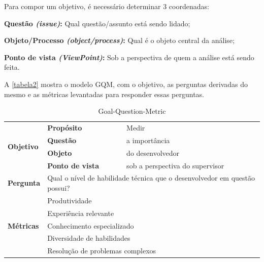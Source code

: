 Para compor um objetivo, é necessário determinar 3 coordenadas:

\begin{alineas}
	\item \textbf{Questão \textit{(issue)}:} Qual questão/assunto está sendo lidado;
	\item \textbf{Objeto/Processo \textit{(object/process)}:} Qual é o objeto central da análise;
	\item \textbf{Ponto de vista \textit{(ViewPoint)}:} Sob a perspectiva de quem a análise está sendo feita.
\end{alineas}
	
A \autoref{tabela2} mostra o modelo GQM, com o objetivo, as perguntas derivadas do mesmo e as métricas levantadas para responder essas perguntas.


\begin{table}[h]
	\footnotesize
	\caption{Goal-Question-Metric}
	\label{tabela2}
	\def\arraystretch{1.5}
	\begin{tabular}{|p{2cm}|p{6.25cm}|p{6.25cm}|}
		\hline
		\multirow{4}{*}{\textbf{Objetivo}} & \textbf{Propósito}                              & Medir                                                 \\ \cline{2-3} 
		& \textbf{Questão}                                & a importância                                         \\ \cline{2-3} 
		& \textbf{Objeto}                                 & do desenvolvedor                                      \\ \cline{2-3} 
		& \textbf{Ponto de vista}                         & sob a perspectiva do supervisor                       \\ \hline
		
		
		\textbf{Pergunta}                  & \multicolumn{2}{l|}{\parbox{12cm}{ Qual o nível de habilidade técnica que o desenvolvedor em questão possui?}}          \\ \hline
		\multirow{5}{*}{\textbf{Métricas}} 
		& \multicolumn{2}{l|}{Produtividade}                                                              \\ \cline{2-3} 
		& \multicolumn{2}{l|}{Experiência relevante}                                                              \\ \cline{2-3} 
		& \multicolumn{2}{l|}{Conhecimento especializado}                                                         \\ \cline{2-3} 
		& \multicolumn{2}{l|}{Diversidade de habilidades}                                                         \\ \cline{2-3} 
		& \multicolumn{2}{l|}{Resolução de problemas complexos}                                                   \\ \hline\hline
		

\end{tabular}
\end{table}
